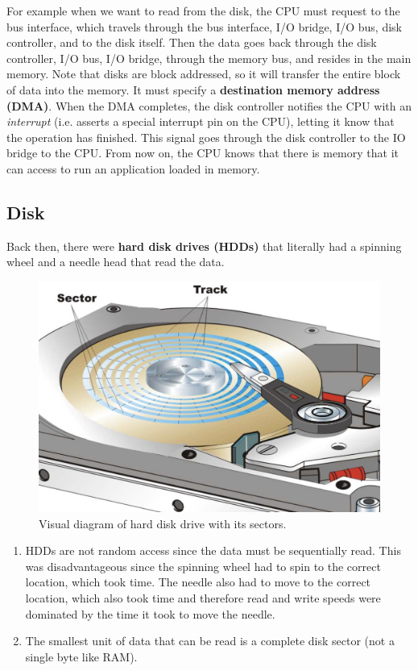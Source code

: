 \documentclass{article}
\begin{document}
    For example when we want to read from the disk, the CPU must request to the bus interface, which travels through the bus interface, I/O bridge, I/O bus, disk controller, and to the disk itself. Then the data goes back through the disk controller, I/O bus, I/O bridge, through the memory bus, and resides in the main memory. Note that disks are block addressed, so it will transfer the entire block of data into the memory. It must specify a \textbf{destination memory address (DMA)}. When the DMA completes, the disk controller notifies the CPU with an \textit{interrupt} (i.e. asserts a special interrupt pin on the CPU), letting it know that the operation has finished. This signal goes through the disk controller to the IO bridge to the CPU. From now on, the CPU knows that there is memory that it can access to run an application loaded in memory. 

  \subsection{Disk} 

    \begin{definition}
      Back then, there were \textbf{hard disk drives (HDDs)} that literally had a spinning wheel and a needle head that read the data. 
      \begin{figure}[H]
        \centering 
        \includegraphics[scale=0.4]{img/hdd.png}
        \caption{Visual diagram of hard disk drive with its sectors. } 
        \label{fig:hdd}
      \end{figure}
      \begin{enumerate}
        \item HDDs are not random access since the data must be sequentially read. This was disadvantageous since the spinning wheel had to spin to the correct location, which took time. The needle also had to move to the correct location, which also took time and therefore read and write speeds were dominated by the time it took to move the needle.
        \item The smallest unit of data that can be read is a complete disk sector (not a single byte like RAM). 
      \end{enumerate}
    \end{definition}
\end{document}
